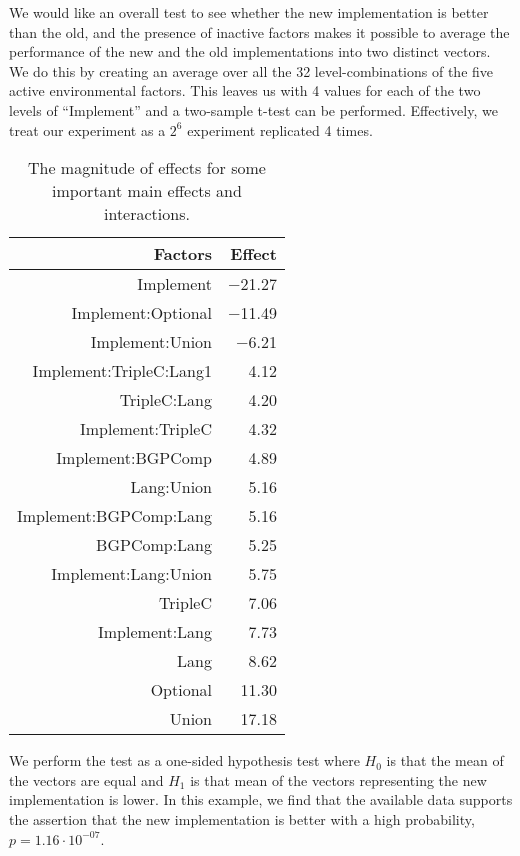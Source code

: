 \documentclass{llncs}
\begin{document}
We would like an overall test to see whether the new implementation is
better than the old, and the presence of inactive factors makes it
possible to average the performance of the new and the old
implementations into two distinct vectors. We do this by creating an
average over all the 32 level-combinations of the five active
environmental factors. This leaves us with 4 values for each of the
two levels of ``Implement'' and a two-sample t-test can be
performed. Effectively, we treat our experiment as a $2^6$ experiment
replicated 4 times.
\begin{wraptable}{l}{0.48\textwidth}
\caption{The magnitude of effects for some important main effects and interactions.}\label{tab:effects}
\bigskip\bigskip
\begin{tabular}{rr}
  \hline
Factors & Effect  \\ 
  \hline
Implement & $-$21.27 \\ 
  Implement:Optional & $-$11.49 \\ 
  Implement:Union & $-$6.21 \\ 
  Implement:TripleC:Lang1 & 4.12 \\ 
  TripleC:Lang & 4.20 \\ 
  Implement:TripleC & 4.32 \\ 
  Implement:BGPComp & 4.89 \\ 
  Lang:Union & 5.16 \\ 
  Implement:BGPComp:Lang & 5.16 \\ 
  BGPComp:Lang & 5.25 \\ 
  Implement:Lang:Union & 5.75 \\ 
  TripleC & 7.06 \\ 
  Implement:Lang & 7.73 \\ 
  Lang & 8.62 \\ 
  Optional & 11.30 \\ 
  Union & 17.18 \\ 
   \hline
\end{tabular}
\end{wraptable}

We perform the test as a one-sided hypothesis test where $H_0$ is that
the mean of the vectors are equal and $H_1$ is that mean of the
vectors representing the new implementation is lower. In this example,
we find that the available data supports the assertion that the new
implementation is better with a high probability, $p=1.16 \cdot
10^{-07}$.
\end{document}
